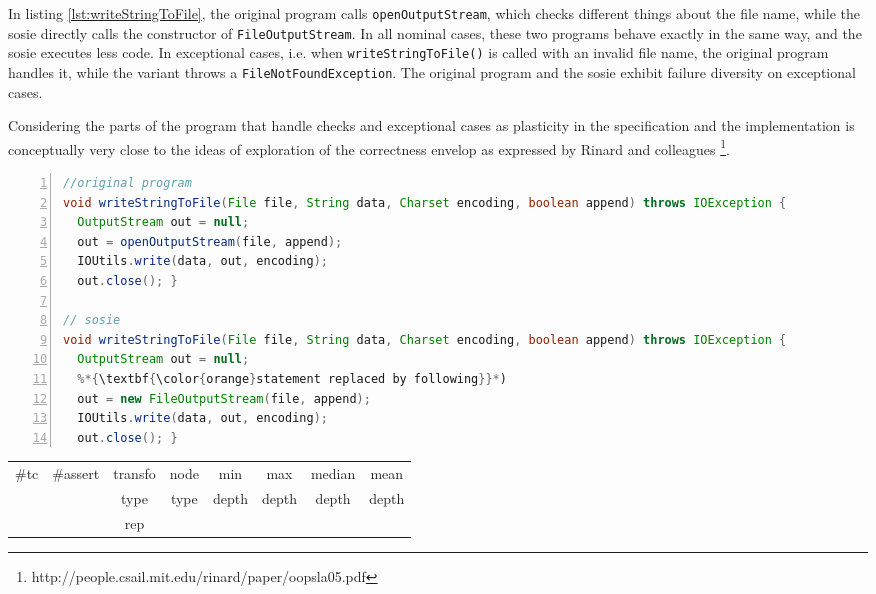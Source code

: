 In listing \ref{lst:writeStringToFile}, the original program calls \texttt{openOutputStream}, which checks different things about the file name, while the sosie  directly calls the constructor of \texttt{FileOutputStream}. 
In all nominal cases, these two programs behave exactly in the same way, and the sosie executes less code. 
In exceptional cases, i.e. when \texttt{writeStringToFile()} is called with an invalid file name, the original program handles it, while the variant throws a \texttt{FileNotFoundException}. 
The original program and the sosie exhibit failure diversity on exceptional cases.

Considering the parts of the program that handle checks and exceptional cases as plasticity in the specification and the implementation is conceptually very close to the ideas of exploration of the correctness envelop as expressed by Rinard and colleagues \footnote{http://people.csail.mit.edu/rinard/paper/oopsla05.pdf}.


\begin{minipage}{\columnwidth}
\begin{lstlisting}[caption={\texttt{writeStringToFile} in commons.io},label={lst:writeStringToFile},language=java,numbers=left]
//original program
void writeStringToFile(File file, String data, Charset encoding, boolean append) throws IOException {
  OutputStream out = null;
  out = openOutputStream(file, append); 
  IOUtils.write(data, out, encoding);
  out.close(); }

// sosie  
void writeStringToFile(File file, String data, Charset encoding, boolean append) throws IOException {
  OutputStream out = null;
  %*{\textbf{\color{orange}statement replaced by following}}*)
  out = new FileOutputStream(file, append); 
  IOUtils.write(data, out, encoding);
  out.close(); }
\end{lstlisting}
\tabcolsep=0.11cm
\begin{tabular}{>{\small}c>{\small}c>{\small}c>{\small}c>{\small}c>{\small}c>{\small}c>{\small}c}
\hline
\rowcolor{lightgray} \#tc & \#assert & transfo & node & min & max & median & mean   \\
\rowcolor{lightgray}  & & type & type & depth  & depth & depth & depth  \\ 
\hline
 &  & rep &  &  &  &  & \\
\hline
\end{tabular}
\end{minipage}
